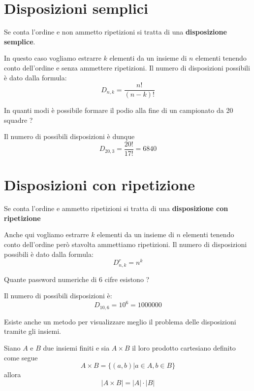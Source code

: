 \section{Disposizioni semplici}
\begin{definition}
	Se conta l'ordine e non ammetto ripetizioni si tratta di una \textbf{disposizione semplice}.
\end{definition}

In questo caso vogliamo estrarre $k$ elementi da un insieme di $n$ elementi tenendo conto
dell'ordine e senza ammettere ripetizioni.
Il numero di disposizioni possibili \`e dato dalla formula:
\begin{equation*}
	D_{n, k} = \frac{n!}{(n - k)!}
\end{equation*}

\begin{example}
	In quanti modi \`e possibile formare il podio alla fine di un campionato da 20 squadre ?

	Il numero di possibili disposizioni \`e dunque
	\begin{equation*}
		D_{20, 3} = \frac{20!}{17!} = 6840
	\end{equation*}
\end{example}

\section{Disposizioni con ripetizione}
\begin{definition}
	Se conta l'ordine e ammetto ripetizioni si tratta di una \textbf{disposizione con ripetizione}
\end{definition}

Anche qui vogliamo estrarre $k$ elementi da un insieme di $n$ elementi tenendo conto dell'ordine
per\`o stavolta ammettiamo ripetizioni.
Il numero di disposizioni possibili \`e dato dalla formula:
\begin{equation*}
	D_{n, k}^r = n^k
\end{equation*}

\begin{example}
	Quante password numeriche di 6 cifre esistono ?

	Il numero di possibili disposizioni \`e:
	\begin{equation*}
		D_{10, 6} = 10^6 = 1000000
	\end{equation*}
\end{example}

Esiste anche un metodo per visualizzare meglio il problema delle disposizioni tramite gli insiemi.
\begin{theorem}
	Siano $A$ e $B$ due insiemi finiti e sia $A \times B$ il loro prodotto cartesiano definito
	come segue
	\begin{equation*}
		A \times B = \{ (a, b) | a \in A, b \in B \}
	\end{equation*}
	allora
	\begin{equation*}
		|A \times B| = |A| \cdot |B|
	\end{equation*}
\end{theorem}

